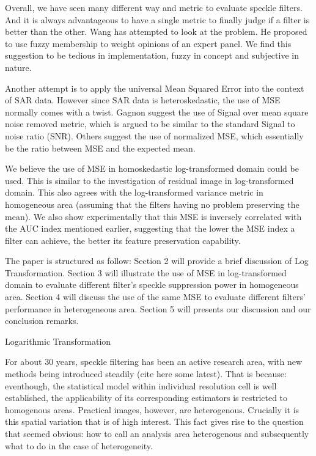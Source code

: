 Overall, we have seen many different way and metric to evaluate speckle filters. 
And it is always advantageous to have a single metric to finally judge if a filter is better than the other.
Wang has attempted to look at the problem. 
He proposed to use fuzzy membership to weight opinions of an expert panel.
We find this suggestion to be tedious in implementation, fuzzy in concept and subjective in nature.

Another attempt is to apply the universal Mean Squared Error into the context of SAR data.
However since SAR data is heteroskedastic, the use of MSE normally comes with a twist.
Gagnon suggest the use of Signal over mean square noise removed metric, which is argued to be similar to the standard Signal to noise ratio (SNR).
Others suggest the use of normalized MSE, which essentially be the ratio between MSE and the expected mean.

We believe the use of MSE in homoskedastic log-transformed domain could be used.
This is similar to the investigation of residual image in log-transformed domain. 
This also agrees with the log-transformed variance metric in homogeneous area (assuming that the filters having no problem preserving the mean).
We also show experimentally that this MSE is inversely correlated with the AUC index mentioned earlier, suggesting that the lower the MSE index a filter can achieve, the better its feature preservation capability.

The paper is structured as follow:
Section 2 will provide a brief discussion of Log Transformation. 
Section 3 will illustrate the use of MSE in log-transformed domain to evaluate different filter's speckle suppression power in homogeneous area.
Section 4 will discuss the use of the same MSE to evaluate different filters' performance in heterogeneous area.
Section 5 will presents our discussion and our conclusion remarks.

Logarithmic Transformation







For about 30 years, speckle filtering has been an active research area, with new methods being introduced steadily (cite here some latest). That is because: eventhough, the statistical model within individual resolution cell is well established, the applicability of its corresponding estimators is restricted to homogenous areas. Practical images, however, are heterogenous. Crucially it is this spatial variation that is of high interest. This fact gives rise to the question that seemed obvious: how to call an analysis area heterogenous and subsequently what to do in the case of heterogeneity.

